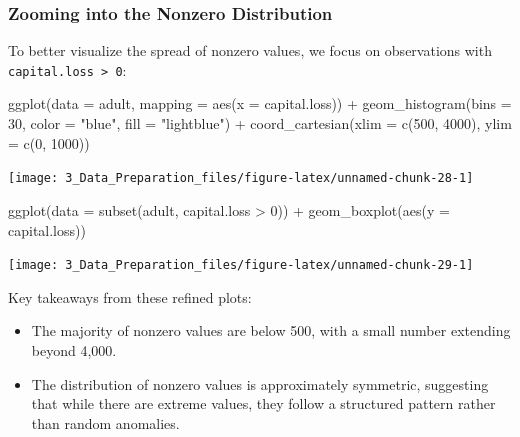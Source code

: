 \documentclass[
  11pt,
]{book}
\makeatletter
\newenvironment{Shaded}{}{}
\newcommand{\AttributeTok}[1]{#1}
\newcommand{\DecValTok}[1]{#1}
\newcommand{\FunctionTok}[1]{#1}
\newcommand{\NormalTok}[1]{#1}
\newcommand{\SpecialCharTok}[1]{\textcolor[rgb]{0.39,0.39,0.39}{#1}}
\newcommand{\StringTok}[1]{\textcolor[rgb]{0.39,0.39,0.39}{#1}}
\providecommand{\tightlist}{%
  \setlength{\itemsep}{0pt}\setlength{\parskip}{0pt}}
\newenvironment{kframe}{%
\medskip{}
\setlength{\fboxsep}{.8em}
 \def\at@end@of@kframe{}%
 \ifinner\ifhmode%
  \def\at@end@of@kframe{\end{minipage}}%
  \begin{minipage}{\columnwidth}%
 \fi\fi%
 \def\FrameCommand##1{\hskip\@totalleftmargin \hskip-\fboxsep
 \colorbox{shadecolor}{##1}\hskip-\fboxsep
     \hskip-\linewidth \hskip-\@totalleftmargin \hskip\columnwidth}%
 \MakeFramed {\advance\hsize-\width
   \@totalleftmargin\z@ \linewidth\hsize
   \@setminipage}}%
 {\par\unskip\endMakeFramed%
 \at@end@of@kframe}
\renewenvironment{Shaded}{\begin{kframe}}{\end{kframe}}
\theoremstyle{definition}
\theoremstyle{definition}
\theoremstyle{definition}
\theoremstyle{definition}
\theoremstyle{remark}
\makeatother
\begin{document}
\subsubsection*{Zooming into the Nonzero Distribution}\label{zooming-into-the-nonzero-distribution}


To better visualize the spread of nonzero values, we focus on observations with \texttt{capital.loss\ \textgreater{}\ 0}:

\begin{Shaded}
\begin{Highlighting}[]
\FunctionTok{ggplot}\NormalTok{(}\AttributeTok{data =}\NormalTok{ adult, }\AttributeTok{mapping =} \FunctionTok{aes}\NormalTok{(}\AttributeTok{x =}\NormalTok{ capital.loss)) }\SpecialCharTok{+}
    \FunctionTok{geom\_histogram}\NormalTok{(}\AttributeTok{bins =} \DecValTok{30}\NormalTok{, }\AttributeTok{color =} \StringTok{"blue"}\NormalTok{, }\AttributeTok{fill =} \StringTok{"lightblue"}\NormalTok{) }\SpecialCharTok{+}
    \FunctionTok{coord\_cartesian}\NormalTok{(}\AttributeTok{xlim =} \FunctionTok{c}\NormalTok{(}\DecValTok{500}\NormalTok{, }\DecValTok{4000}\NormalTok{), }\AttributeTok{ylim =} \FunctionTok{c}\NormalTok{(}\DecValTok{0}\NormalTok{, }\DecValTok{1000}\NormalTok{))}
\end{Highlighting}
\end{Shaded}

\begin{center}\texttt{[image: 3\_Data\_Preparation\_files/figure-latex/unnamed-chunk-28-1]} \end{center}

\begin{Shaded}
\begin{Highlighting}[]
\FunctionTok{ggplot}\NormalTok{(}\AttributeTok{data =} \FunctionTok{subset}\NormalTok{(adult, capital.loss }\SpecialCharTok{\textgreater{}} \DecValTok{0}\NormalTok{)) }\SpecialCharTok{+}
     \FunctionTok{geom\_boxplot}\NormalTok{(}\FunctionTok{aes}\NormalTok{(}\AttributeTok{y =}\NormalTok{ capital.loss)) }
\end{Highlighting}
\end{Shaded}

\begin{center}\texttt{[image: 3\_Data\_Preparation\_files/figure-latex/unnamed-chunk-29-1]} \end{center}

Key takeaways from these refined plots:

\begin{itemize}
\tightlist
\item
  The majority of nonzero values are below 500, with a small number extending beyond 4,000.\\
\item
  The distribution of nonzero values is approximately symmetric, suggesting that while there are extreme values, they follow a structured pattern rather than random anomalies.
\end{itemize}
\end{document}
